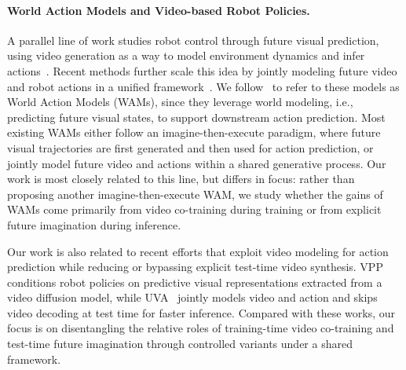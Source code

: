 \paragraph{World Action Models and Video-based Robot Policies.}
A parallel line of work studies robot control through future visual prediction, using video generation as a way to model environment dynamics and infer actions~\cite{du2023learninguniversalpoliciestextguided, wu2023unleashing, zhou2024robodreamer, feng2025vidarembodiedvideodiffusion, bharadhwaj2024gen2act, won2025dualstreamdiffusionworldmodelaugmented, cheang2024gr2generativevideolanguageactionmodel, jang2025dreamgenunlockinggeneralizationrobot, zhao2025cotvlavisualchainofthoughtreasoning, cen2025rynnvla, cen2025WorldVLA, zhou2025act2goalworldmodelgeneral, zheng2025flarerobotlearningimplicit, dreamvla25}. Recent methods further scale this idea by jointly modeling future video and robot actions in a unified framework~\cite{zhu2025unifiedworldmodelscoupling, liang2025videogenerators, kim2026cosmos, ge2025, pai2025mimicvideo, lingbot-va2026, bi2025motusunifiedlatentaction, ye2026worldactionmodelszeroshot}. We follow~\cite{ye2026worldactionmodelszeroshot} to refer to these models as World Action Models (WAMs), since they leverage world modeling, i.e., predicting future visual states, to support downstream action prediction. Most existing WAMs either follow an imagine-then-execute paradigm, where future visual trajectories are first generated and then used for action prediction, or jointly model future video and actions within a shared generative process. Our work is most closely related to this line, but differs in focus: rather than proposing another imagine-then-execute WAM, we study whether the gains of WAMs come primarily from video co-training during training or from explicit future imagination during inference.

Our work is also related to recent efforts that exploit video modeling for action prediction while reducing or bypassing explicit test-time video synthesis. VPP~\cite{hu2024video} conditions robot policies on predictive visual representations extracted from a video diffusion model, while UVA~\cite{li2025unified} jointly models video and action and skips video decoding at test time for faster inference. Compared with these works, our focus is on disentangling the relative roles of training-time video co-training and test-time future imagination through controlled variants under a shared framework.